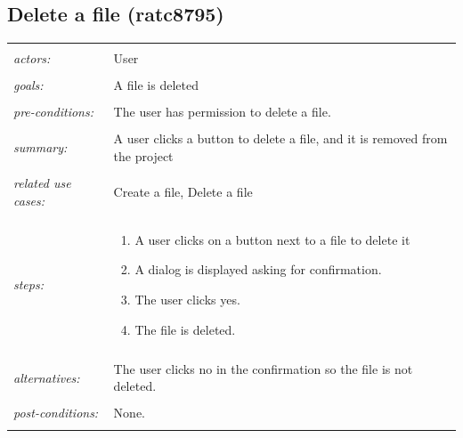 \documentclass[11pt]{report}
\begin{document}
\subsection{Delete a file (ratc8795)}
\begin{tabular}{ p{2cm} p{12cm} }
 \hline
 \\
 \textit{actors:} & User \\ 
 \\
 \textit{goals:} & A file is deleted \\
 \\
 \textit{pre-conditions:} & The user has permission to delete a file. \\
 \\
 \textit{summary:} & A user clicks a button to delete a file, and it is removed from the project \\ 
 \\
 \textit{related use cases:} & Create a file, Delete a file \\ 
 \\
 \textit{steps:} & \begin{enumerate}
  \item A user clicks on a button next to a file to delete it
  \item A dialog is displayed asking for confirmation.
  \item The user clicks yes.
  \item The file is deleted.
 \end{enumerate} \\
 \\
 \textit{alternatives:} & The user clicks no in the confirmation so the file is not deleted. \\
 \\
 \textit{post-conditions:} & None. \\
 \\
\hline
\end{tabular}
\end{document}
